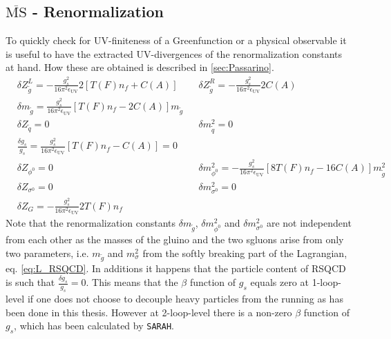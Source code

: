 \subsection{$\overline{\mathrm{MS}}$ - Renormalization}\label{sec:MSRen}
To quickly check for UV-finiteness of a Greenfunction or a physical observable it is useful to have the extracted UV-divergences of the renormalization constants at hand. How these are obtained is described in \ref{sec:Passarino}.
\begin{align}
& \delta Z_{\tilde{g}}^L = -\frac{g_s^2}{16\pi^2\epsilon_{\mathrm{UV}}} 2\left[ T(F) n_f + C(A) \right] &&  \delta Z_{\tilde{g}}^R = -\frac{g_s^2}{16\pi^2\epsilon_{\mathrm{UV}}} 2 C(A)\nonumber\\
& \delta m_{\tilde{g}} = \frac{g_s^2}{16\pi^2\epsilon_{\mathrm{UV}}} \left[ T(F) n_f - 2C(A) \right] m_{\tilde{g}}\nonumber\\
& \delta Z_{\tilde{q}} = 0 && \delta m_{\tilde{q}}^2 = 0\nonumber\\
&\frac{\delta g_s}{g_s} = \frac{g_s^2}{16\pi^2\epsilon_{\mathrm{UV}}}\left[ T(F) n_f - C(A) \right] = 0\nonumber\\
& \delta Z_{\phi^0} = 0 && \delta m_{\phi^0}^2 = -\frac{g_s^2}{16\pi^2\epsilon_{\mathrm{UV}}}\left[ 8T(F)n_f - 16C(A) \right]m_{\tilde{g}}^2\nonumber\\
& \delta Z_{\sigma^0} = 0 && \delta m_{\sigma^0}^2 = 0\nonumber\\
& \delta Z_{G} = -\frac{g_s^2}{16\pi^2\epsilon_{\mathrm{UV}}} 2T(F) n_f
\end{align}
Note that the renormalization constants $\delta m_{\tilde{g}}$, $\delta m^2_{\phi^0}$ and $\delta m^2_{\sigma^0}$ are not independent from each other as the masses of the gluino and the two sgluons arise  from only two parameters, i.e. $m_{\tilde{g}}$ and $m_{\sigma}^2$ from the softly breaking part of the Lagrangian, eq. \eqref{eq:L_RSQCD}. 
In additions it happens that the particle content of RSQCD is such that $\frac{\delta g_s}{g_s} = 0$. This means that the $\beta$ function of $g_s$ equals zero at 1-loop-level if one does not choose to decouple heavy particles from the running as has been done in this thesis. However at 2-loop-level there is a non-zero $\beta$ function of $g_s$, which has been calculated by \texttt{SARAH}.




